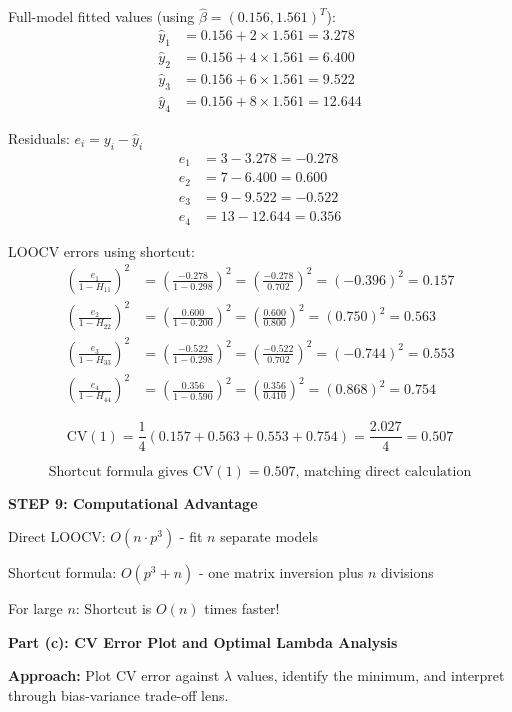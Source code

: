\documentclass[12pt]{article}
\begin{document}
\begin{solution}
Full-model fitted values (using $\hat{\beta} = (0.156, 1.561)^T$):
\begin{align*}
\hat{y}_1 &= 0.156 + 2 \times 1.561 = 3.278 \\
\hat{y}_2 &= 0.156 + 4 \times 1.561 = 6.400 \\
\hat{y}_3 &= 0.156 + 6 \times 1.561 = 9.522 \\
\hat{y}_4 &= 0.156 + 8 \times 1.561 = 12.644
\end{align*}

Residuals: $e_i = y_i - \hat{y}_i$
\begin{align*}
e_1 &= 3 - 3.278 = -0.278 \\
e_2 &= 7 - 6.400 = 0.600 \\
e_3 &= 9 - 9.522 = -0.522 \\
e_4 &= 13 - 12.644 = 0.356
\end{align*}

LOOCV errors using shortcut:
\begin{align*}
\left(\frac{e_1}{1 - H_{11}}\right)^2 &= \left(\frac{-0.278}{1 - 0.298}\right)^2 = \left(\frac{-0.278}{0.702}\right)^2 = (-0.396)^2 = 0.157 \\
\left(\frac{e_2}{1 - H_{22}}\right)^2 &= \left(\frac{0.600}{1 - 0.200}\right)^2 = \left(\frac{0.600}{0.800}\right)^2 = (0.750)^2 = 0.563 \\
\left(\frac{e_3}{1 - H_{33}}\right)^2 &= \left(\frac{-0.522}{1 - 0.298}\right)^2 = \left(\frac{-0.522}{0.702}\right)^2 = (-0.744)^2 = 0.553 \\
\left(\frac{e_4}{1 - H_{44}}\right)^2 &= \left(\frac{0.356}{1 - 0.590}\right)^2 = \left(\frac{0.356}{0.410}\right)^2 = (0.868)^2 = 0.754
\end{align*}

\[\text{CV}(1) = \frac{1}{4}(0.157 + 0.563 + 0.553 + 0.754) = \frac{2.027}{4} = 0.507\]

\[\boxed{\text{Shortcut formula gives CV}(1) = 0.507 \text{, matching direct calculation}}\]

\textbf{STEP 9: Computational Advantage}

Direct LOOCV: $O(n \cdot p^3)$ - fit $n$ separate models

Shortcut formula: $O(p^3 + n)$ - one matrix inversion plus $n$ divisions

For large $n$: Shortcut is $O(n)$ times faster!

\textbf{Part (c): CV Error Plot and Optimal Lambda Analysis}

\textbf{Approach:} Plot CV error against $\lambda$ values, identify the minimum, and interpret through bias-variance trade-off lens.


\end{solution}
\end{document}
